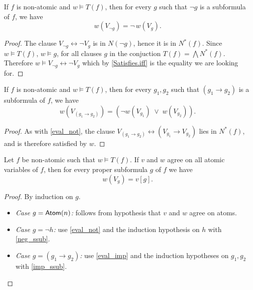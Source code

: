 \begin{lemma}
    \label{eval_not}
    \leanok
    If $f$ is non-atomic and $w \models T(f)$, then for every $g$ such that $\neg g$ is a subformula of $f$, we have
    \[
    w(V_{\neg g}) = \neg \, w(V_g).
    \]
\end{lemma}
\begin{proof}
    \leanok
    The clause $V_{\neg g} \leftrightarrow \neg V_g$ is in $N(\neg g)$, hence it is in $N^*(f)$.
    Since $w \models T(f)$, $w \models g$, for all clauses $g$ in the conjuction $T(f) = \bigwedge N^*(f)$.
    Therefore $w \models V_{\neg g} \leftrightarrow \neg V_g$ which by \ref{Satisfies.iff} is the equality we are looking for.
\end{proof}

\begin{lemma}
    \label{eval_imp}
    \leanok
    If $f$ is non-atomic and $w \models T(f)$, then for every $g_1, g_2$ such that $(g_1 \to g_2)$ is a subformula of $f$, we have
    \[
    w(V_{(g_1 \to g_2)}) = (\neg w(V_{g_1}) \;\lor\; w(V_{g_2})).
    \]
\end{lemma}
\begin{proof}
    \leanok
    As with \ref{eval_not}, the clause $V_{(g_1 \to g_2)} \leftrightarrow (V_{g_1} \to V_{g_2})$ lies in $N^*(f)$, and is therefore satisfied by $w$.
\end{proof}

\begin{theorem}
    \label{eval_eq_of_mem_ssub}
    \leanok
    Let $f$ be non-atomic such that $w \models T(f)$.
    If $v$ and $w$ agree on all atomic variables of $f$, then for every proper subformula $g$ of $f$ we have
    \[
    w(V_g) = v[g].
    \]
\end{theorem}
\begin{proof}
    \leanok
    By induction on $g$.
    \begin{itemize}
        \item \emph{Case $g=\mathsf{Atom}(n)$:} follows from hypothesis that $v$ and $w$ agree on atoms.  
        \item \emph{Case $g=\neg h$:} use \ref{eval_not} and the induction hypothesis on $h$ with \ref{neg_ssub}.  
        \item \emph{Case $g=(g_1 \to g_2)$:} use \ref{eval_imp} and the induction hypotheses on $g_1,g_2$ with \ref{imp_ssub}.
    \end{itemize}
\end{proof}
